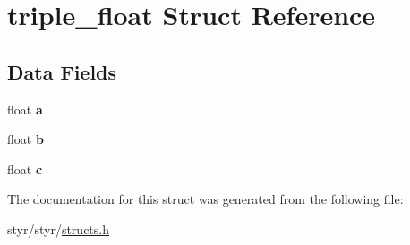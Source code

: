 \hypertarget{structtriple__float}{}\section{triple\+\_\+float Struct Reference}
\label{structtriple__float}
\subsection*{Data Fields}
\begin{DoxyCompactItemize}
\item 
float {\bfseries a}\hypertarget{structtriple__float_a4aec1a5be9d9a4a394a2e49e9744286e}{}\label{structtriple__float_a4aec1a5be9d9a4a394a2e49e9744286e}

\item 
float {\bfseries b}\hypertarget{structtriple__float_a83fc1af92e29717b4513d121b0c72c7d}{}\label{structtriple__float_a83fc1af92e29717b4513d121b0c72c7d}

\item 
float {\bfseries c}\hypertarget{structtriple__float_ae78103ab33f03590e84ff7bc735629d7}{}\label{structtriple__float_ae78103ab33f03590e84ff7bc735629d7}

\end{DoxyCompactItemize}


The documentation for this struct was generated from the following file\+:\begin{DoxyCompactItemize}
\item 
styr/styr/\hyperlink{structs_8h}{structs.\+h}\end{DoxyCompactItemize}
